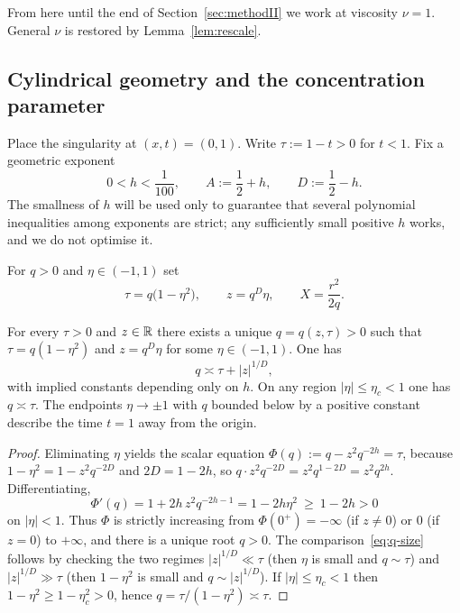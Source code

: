From here until the end of Section~\ref{sec:methodII} we work at viscosity $\nu=1$. General $\nu$ is restored by Lemma~\ref{lem:rescale}.

\subsection{Cylindrical geometry and the concentration parameter}
\label{sec:sim-coords}

Place the singularity at $(x,t)=(0,1)$. Write $\tau:=1-t>0$ for $t<1$. Fix a geometric exponent
\begin{equation}
\label{eq:h}
0<h<\frac1{100},
\qquad
A:=\frac12+h,
\qquad
D:=\frac12-h.
\end{equation}
The smallness of $h$ will be used only to guarantee that several polynomial inequalities among exponents are strict; any sufficiently small positive $h$ works, and we do not optimise it.

\begin{definition}
\label{def:sim}
For $q>0$ and $\eta\in(-1,1)$ set
\begin{equation}
\label{eq:sim}
\tau=q\bigl(1-\eta^2\bigr),
\qquad
z=q^{D}\eta,
\qquad
X=\frac{r^2}{2q}.
\end{equation}
\end{definition}

\begin{lemma}
\label{lem:invert}
For every $\tau>0$ and $z\in\mathbb{R}$ there exists a unique $q=q(z,\tau)>0$ such that $\tau=q(1-\eta^2)$ and $z=q^D\eta$ for some $\eta\in(-1,1)$. One has
\begin{equation}
\label{eq:q-size}
q\asymp \tau+|z|^{1/D},
\end{equation}
with implied constants depending only on $h$. On any region $|\eta|\le\eta_c<1$ one has $q\asymp\tau$. The endpoints $\eta\to\pm 1$ with $q$ bounded below by a positive constant describe the time $t=1$ away from the origin.
\end{lemma}

\begin{proof}
Eliminating $\eta$ yields the scalar equation $\Phi(q):=q-z^2 q^{-2h}=\tau$, because $1-\eta^2=1-z^2 q^{-2D}$ and $2D=1-2h$, so $q\cdot z^2 q^{-2D}=z^2 q^{1-2D}=z^2 q^{2h}$. Differentiating,
\[
\Phi'(q)=1+2h\,z^2 q^{-2h-1}=1-2h\eta^2\ \ge\ 1-2h>0
\]
on $|\eta|<1$. Thus $\Phi$ is strictly increasing from $\Phi(0^+)=-\infty$ (if $z\neq 0$) or $0$ (if $z=0$) to $+\infty$, and there is a unique root $q>0$. The comparison~\eqref{eq:q-size} follows by checking the two regimes $|z|^{1/D}\ll\tau$ (then $\eta$ is small and $q\sim\tau$) and $|z|^{1/D}\gg\tau$ (then $1-\eta^2$ is small and $q\sim|z|^{1/D}$). If $|\eta|\le\eta_c<1$ then $1-\eta^2\ge 1-\eta_c^2>0$, hence $q=\tau/(1-\eta^2)\asymp\tau$.
\end{proof}

